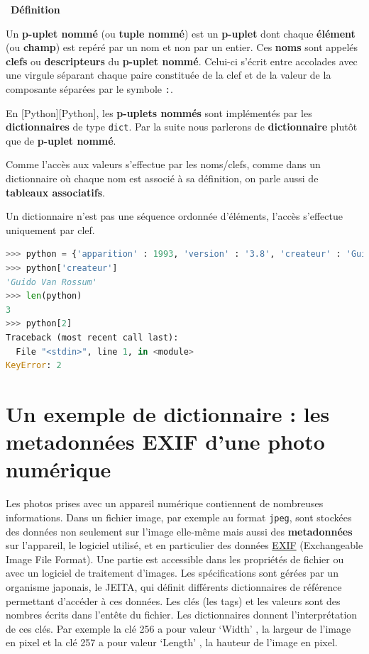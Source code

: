 \documentclass[
  11pt,
]{article}
\newcommand{\passthrough}[1]{#1}
\newcounter{prop}
\newcounter{def}
\newenvironment{definition}[1]
{\par \medskip   \addtocounter{def}{1} \noindent  
\begin{bclogo}[arrondi =0.1,  ombre = true, barre=none, logo=\bcbook, marge=4]{~\textbf{Définition} \textbf{\thedef} {\itshape #1} }  \par}
{
\end{bclogo}
 \par \bigskip }
\newcounter{logi}
\begin{document}
\begin{definition}{}

Un \textbf{p-uplet nommé} (ou \textbf{tuple nommé}) est un
\textbf{p-uplet} dont chaque \textbf{élément} (ou \textbf{champ}) est
repéré par un nom et non par un entier. Ces \textbf{noms} sont appelés
\textbf{clefs} ou \textbf{descripteurs} du \textbf{p-uplet nommé}.
Celui-ci s'écrit entre accolades avec une virgule séparant chaque paire
constituée de la clef et de la valeur de la composante séparées par le
symbole \passthrough{\lstinline!:!}.

En {[}Python{]}{[}Python{]}, les \textbf{p-uplets nommés} sont
implémentés par les \textbf{dictionnaires} de type
\passthrough{\lstinline!dict!}. Par la suite nous parlerons de
\textbf{dictionnaire} plutôt que de \textbf{p-uplet nommé}.

Comme l'accès aux valeurs s'effectue par les noms/clefs, comme dans un
dictionnaire où chaque nom est associé à sa définition, on parle aussi
de \textbf{tableaux associatifs}.

Un dictionnaire n'est pas une séquence ordonnée d'éléments, l'accès
s'effectue uniquement par clef.

\begin{lstlisting}[language=Python]
>>> python = {'apparition' : 1993, 'version' : '3.8', 'createur' : 'Guido Van Rossum'}
>>> python['createur']
'Guido Van Rossum'
>>> len(python)
3
>>> python[2]
Traceback (most recent call last):
  File "<stdin>", line 1, in <module>
KeyError: 2
\end{lstlisting}

\end{definition}

\hypertarget{un-exemple-de-dictionnaire-les-metadonnuxe9es-exif-dune-photo-numuxe9rique}{%
\section{Un exemple de dictionnaire : les metadonnées EXIF d'une photo
numérique}\label{un-exemple-de-dictionnaire-les-metadonnuxe9es-exif-dune-photo-numuxe9rique}}

Les photos prises avec un appareil numérique contiennent de nombreuses
informations. Dans un fichier image, par exemple au format
\passthrough{\lstinline!jpeg!}, sont stockées des données non seulement
sur l'image elle-même mais aussi des \textbf{metadonnées} sur
l'appareil, le logiciel utilisé, et en particulier des données
\href{https://fr.wikipedia.org/wiki/Exchangeable_image_file_format}{EXIF}
(Exchangeable Image File Format). Une partie est accessible dans les
propriétés de fichier ou avec un logiciel de traitement d'images. Les
spécifications sont gérées par un organisme japonais, le JEITA, qui
définit différents dictionnaires de référence permettant d'accéder à ces
données. Les clés (les tags) et les valeurs sont des nombres écrits dans
l'entête du fichier. Les dictionnaires donnent l'interprétation de ces
clés. Par exemple la clé 256 a pour valeur `Width' , la largeur de
l'image en pixel et la clé 257 a pour valeur `Length' , la hauteur de
l'image en pixel.
\end{document}
